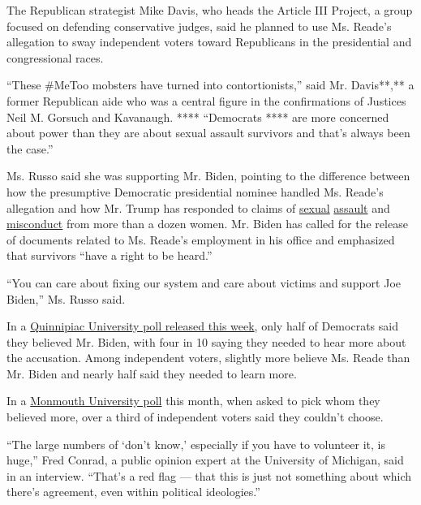 The Republican strategist Mike Davis, who heads the Article III Project,
a group focused on defending conservative judges, said he planned to use
Ms. Reade's allegation to sway independent voters toward Republicans in
the presidential and congressional races.

``These \#MeToo mobsters have turned into contortionists,'' said Mr.
Davis**,** a former Republican aide who was a central figure in the
confirmations of Justices Neil M. Gorsuch and Kavanaugh. ****
``Democrats **** are more concerned about power than they are about
sexual assault survivors and that's always been the case.''

Ms. Russo said she was supporting Mr. Biden, pointing to the difference
between how the presumptive Democratic presidential nominee handled Ms.
Reade's allegation and how Mr. Trump has responded to claims of
\href{https://www.nytimes3xbfgragh.onion/2017/01/17/us/former-apprentice-contestant-files-defamation-suit-against-trump.html}{sexual}
\href{https://www.nytimes3xbfgragh.onion/2019/06/24/us/politics/jean-carroll-trump.html}{assault}
and
\href{https://www.nytimes3xbfgragh.onion/2016/10/13/us/politics/donald-trump-women.html}{misconduct}
from more than a dozen women. Mr. Biden has called for the release of
documents related to Ms. Reade's employment in his office and emphasized
that survivors ``have a right to be heard.''

``You can care about fixing our system and care about victims and
support Joe Biden,'' Ms. Russo said.

In a
\href{https://poll.qu.edu/national/release-detail?ReleaseID=3661}{Quinnipiac
University poll released this week}, only half of Democrats said they
believed Mr. Biden, with four in 10 saying they needed to hear more
about the accusation. Among independent voters, slightly more believe
Ms. Reade than Mr. Biden and nearly half said they needed to learn more.

In a
\href{https://www.monmouth.edu/polling-institute/reports/monmouthpoll_us_050620/}{Monmouth
University poll} this month, when asked to pick whom they believed more,
over a third of independent voters said they couldn't choose.

``The large numbers of `don't know,' especially if you have to volunteer
it, is huge,'' Fred Conrad, a public opinion expert at the University of
Michigan, said in an interview. ``That's a red flag --- that this is
just not something about which there's agreement, even within political
ideologies.''

